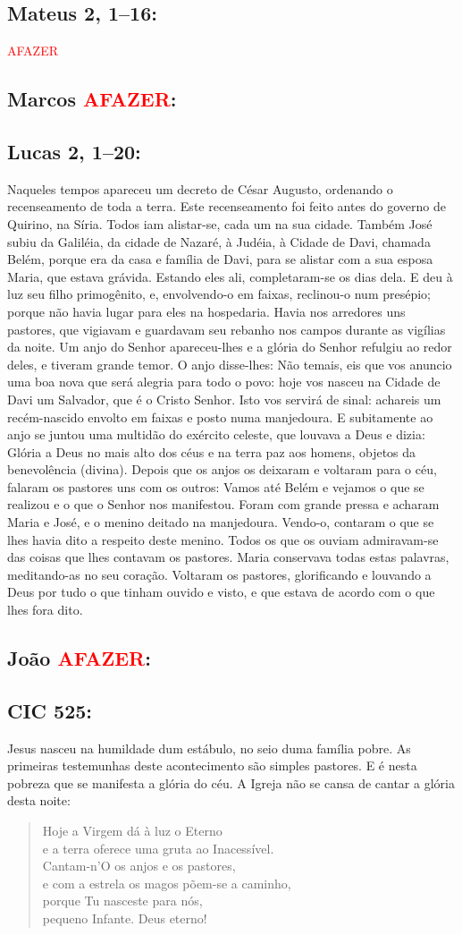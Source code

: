 \documentclass[10pt,a5paper]{book}
\newcommand{\from}[1]{\subsection*{#1}}
\newcommand{\TODO}{\textcolor{red}{\ttfamily AFAZER}}
\begin{document}
\from{Mateus 2, 1--16:}

\TODO

\from{Marcos \TODO:}

\from{Lucas 2, 1--20:}

Naqueles tempos apareceu um decreto de César Augusto, ordenando o recenseamento de toda a terra.
Este recenseamento foi feito antes do governo de Quirino, na Síria.
Todos iam alistar-se, cada um na sua cidade.
Também José subiu da Galiléia, da cidade de Nazaré, à Judéia, à Cidade de Davi, chamada Belém, porque era da casa e família de Davi,
para se alistar com a sua esposa Maria, que estava grávida.
Estando eles ali, completaram-se os dias dela.
E deu à luz seu filho primogênito, e, envolvendo-o em faixas, reclinou-o num presépio;
porque não havia lugar para eles na hospedaria.
Havia nos arredores uns pastores, que vigiavam e guardavam seu rebanho nos campos durante as vigílias da noite.
Um anjo do Senhor apareceu-lhes e a glória do Senhor refulgiu ao redor deles, e tiveram grande temor.
O anjo disse-lhes:
Não temais, eis que vos anuncio uma boa nova que será alegria para todo o povo:
hoje vos nasceu na Cidade de Davi um Salvador, que é o Cristo Senhor.
Isto vos servirá de sinal:
achareis um recém-nascido envolto em faixas e posto numa manjedoura.
E subitamente ao anjo se juntou uma multidão do exército celeste, que louvava a Deus e dizia:
Glória a Deus no mais alto dos céus e na terra paz aos homens, objetos da benevolência (divina).
Depois que os anjos os deixaram e voltaram para o céu, falaram os pastores uns com os outros:
Vamos até Belém e vejamos o que se realizou e o que o Senhor nos manifestou.
Foram com grande pressa e acharam Maria e José, e o menino deitado na manjedoura.
Vendo-o, contaram o que se lhes havia dito a respeito deste menino.
Todos os que os ouviam admiravam-se das coisas que lhes contavam os pastores.
Maria conservava todas estas palavras, meditando-as no seu coração.
Voltaram os pastores, glorificando e louvando a Deus por tudo o que tinham ouvido e visto, e que estava de acordo com o que lhes fora dito.

\from{João \TODO:}

\from{CIC 525:}

Jesus nasceu na humildade dum estábulo, no seio duma família pobre.
As primeiras testemunhas deste acontecimento são simples pastores.
E é nesta pobreza que se manifesta a glória do céu.
A Igreja não se cansa de cantar a glória desta noite:

\begin{verse}
Hoje a Virgem dá à luz o Eterno \\
e a terra oferece uma gruta ao Inacessível. \\
Cantam-n'O os anjos e os pastores, \\
e com a estrela os magos põem-se a caminho, \\
porque Tu nasceste para nós, \\
pequeno Infante. Deus eterno!
\end{verse}
\end{document}
